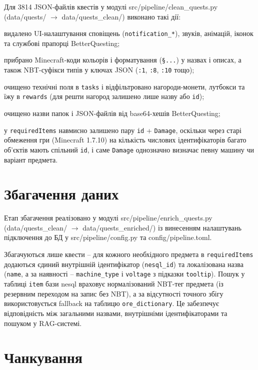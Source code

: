 Для 3814 JSON-файлів квестів у модулі src/pipeline/clean\_quests.py (data/quests/ $\rightarrow$ data/quests\_clean/) виконано такі дії:
\begin{dashlist}[wide]
    \item видалено UI-налаштування сповіщень (\texttt{notification\_*}), звуків, анімацій, іконок та службові прапорці BetterQuesting;
    \item прибрано Minecraft-коди кольорів і форматування (\texttt{§...}) у назвах і описах, а також NBT-суфікси типів у ключах JSON (\texttt{:1}, \texttt{:8}, \texttt{:10} тощо);
    \item очищено технічні поля в \texttt{tasks} і відфільтровано нагороди-монети, лутбокси та їжу в \texttt{rewards} (для решти нагород залишено лише назву або \texttt{id});
    \item очищено назви папок і JSON-файлів від base64-хешів BetterQuesting;
    \item у \texttt{requiredItems} навмисно залишено пару \texttt{id} + \texttt{Damage}, оскільки через старі обмеження гри (Minecraft 1.7.10) на кількість числових ідентифікаторів багато об'єктів мають спільний \texttt{id}, і саме \texttt{Damage} однозначно визначає певну машину чи варіант предмета.
\end{dashlist}


\section{Збагачення даних}

Етап збагачення реалізовано у модулі src/pipeline/enrich\_quests.py (data/quests\_clean/ $\rightarrow$ data/quests\_enriched/) із винесенням налаштувань підключення до БД у src/pipeline/config.py та config/pipeline.toml.

Збагачуються лише квести -- для кожного необхідного предмета в \texttt{requiredItems} додаються єдиний внутрішній ідентифікатор (\texttt{nesql\_id}) та локалізована назва (\texttt{name}, а за наявності -- \texttt{machine\_type} і \texttt{voltage} з підказки \texttt{tooltip}). Пошук у таблиці \texttt{item} бази nesql враховує нормалізований NBT-тег предмета (із резервним переходом на запис без NBT), а за відсутності точного збігу використовується fallback на таблицю \texttt{ore\_dictionary}. Це забезпечує відповідність між загальними назвами, внутрішніми ідентифікаторами та пошуком у RAG-системі.


\section{Чанкування}

